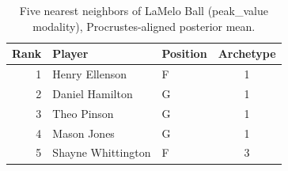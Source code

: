 \begin{table}[htbp]
  \centering\small
  \begin{tabular}{rllc}
    \toprule
    Rank & Player & Position & Archetype \\
    \midrule
    1 & Henry Ellenson & F & 1 \\
    2 & Daniel Hamilton & G & 1 \\
    3 & Theo Pinson & G & 1 \\
    4 & Mason Jones & G & 1 \\
    5 & Shayne Whittington & F & 3 \\
    \bottomrule
  \end{tabular}
  \caption{Five nearest neighbors of LaMelo Ball (peak_value modality), Procrustes-aligned posterior mean.}
  \label{tab:LaMelo_Ball_neighbors_peak_value}
\end{table}

